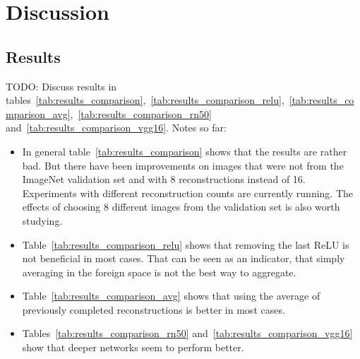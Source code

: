 \documentclass[10pt,twocolumn]{article}
\begin{document}
\section{Discussion}
\subsection{Results}
TODO: Discuss results in tables~\ref{tab:results_comparison},~\ref{tab:results_comparison_relu},~\ref{tab:results_comparison_avg},~\ref{tab:results_comparison_rn50} and~\ref{tab:results_comparison_vgg16}.
Notes so far:
\begin{itemize}
    \item In general table~\ref{tab:results_comparison} shows that the results are rather bad.
        But there have been improvements on images that were not from the ImageNet validation set and with 8 reconstructions instead of 16.
        Experiments with different reconstruction counts are currently running.
        The effects of choosing 8 different images from the validation set is also worth studying.
    \item Table~\ref{tab:results_comparison_relu} shows that removing the last ReLU is not beneficial in most cases.
        That can be seen as an indicator, that simply averaging in the foreign space is not the best way to aggregate.
    \item Table~\ref{tab:results_comparison_avg} shows that using the average of previously completed reconstructions is better in most cases. 
    \item Tables~\ref{tab:results_comparison_rn50} and~\ref{tab:results_comparison_vgg16} show that deeper networks seem to perform better.
\end{itemize}
\end{document}
